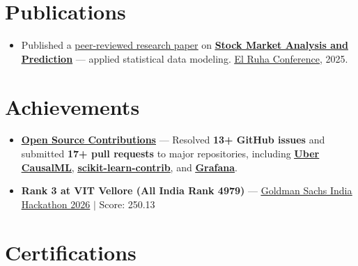\documentclass[a4paper,10pt]{article}
\newcommand{\ulink}[2]{\href{#1}{\uline{#2}}}
\begin{document}
\vspace{1pt}

\section{Publications}
\vspace{1pt}
\begin{itemize}[nosep, leftmargin=1.5em, itemsep=1pt, topsep=2pt]
  \item {\color[HTML]{0A0A0A}\fontsize{11}{14}\selectfont
  Published a \ulink{https://www.elruha.org/_files/ugd/614b1f_6b95e1b697bf452b9907ba46e0151c05.pdf\#page=774}{peer-reviewed research paper} on \ulink{https://github.com/su-jin1425/Set-Project}{\textbf{Stock Market Analysis and Prediction}} --- applied statistical data modeling. \ulink{https://www.elruha.org/congress-books}{El Ruha Conference}, 2025.}
\end{itemize}

\vspace{1pt}

\section{Achievements}
\vspace{1pt}
\begin{itemize}[nosep, leftmargin=1.5em, itemsep=1pt, topsep=2pt]
  \item {\color[HTML]{0A0A0A}\fontsize{11}{14}\selectfont \textbf{\ulink{https://github.com/su-jin1425/My-Open-Source-Contributions}{Open Source Contributions}} --- Resolved \textbf{13+ GitHub issues} and submitted \textbf{17+ pull requests} to major repositories, including \ulink{https://github.com/uber/causalml}{\textbf{Uber CausalML}}, \ulink{https://github.com/scikit-learn-contrib/forest-confidence-interval}{\textbf{scikit-learn-contrib}}, and \ulink{https://github.com/grafana/alloy-scenarios}{\textbf{Grafana}}.}
  \item {\color[HTML]{0A0A0A}\fontsize{11}{14}\selectfont \textbf{Rank 3 at VIT Vellore (All India Rank 4979)} --- \ulink{https://www.hackerrank.com/contests/goldman-sachs-india-hackathon-2026-cs/leaderboard}{Goldman Sachs India Hackathon 2026} $|$ Score: 250.13}
\end{itemize}

\vspace{1pt}

\section{Certifications}
\vspace{1pt}
\end{document}
